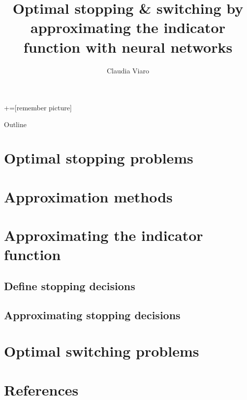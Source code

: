 \documentclass[9pt]{beamer} %
\author{Claudia Viaro}
\title[Optimal stopping \& switching]{Optimal stopping \& switching by approximating the indicator function with neural networks}
\begin{document}
\maketitle




+=[remember picture]

\everymath{\displaystyle}
\begin{frame}{Outline}
    \tableofcontents
\end{frame}
\section{Optimal stopping problems}
\section{Approximation methods}
\section{Approximating the indicator function}
    \subsection{Define stopping decisions}
    \subsection{Approximating stopping decisions}
    \subsection{}
\section{Optimal switching problems}
\section*{References}
\begin{frame}
\end{frame}

\end{document}
